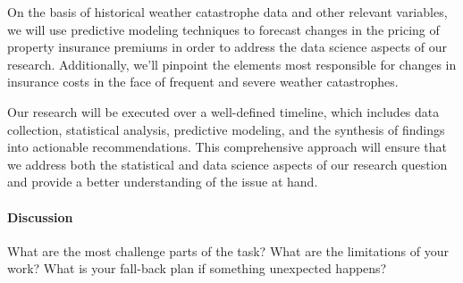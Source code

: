 \documentclass[12pt]{article}
\begin{document}
On the basis of historical weather catastrophe data and other relevant variables, we will use predictive modeling techniques to 
forecast changes in the pricing of property insurance premiums in order to address the data science aspects of our research. 
Additionally, we'll pinpoint the elements most responsible for changes in insurance costs in the face of frequent and severe weather 
catastrophes.

Our research will be executed over a well-defined timeline, which includes data collection, statistical analysis, predictive modeling, 
and the synthesis of findings into actionable recommendations. This comprehensive approach will ensure that we address both the 
statistical and data science aspects of our research question and provide a better understanding of the issue at hand.

\paragraph{Discussion}
What are the most challenge parts of the task?
What are the limitations of your work? What is your fall-back plan if
something unexpected happens?

\lipsum[5]



\end{document}
